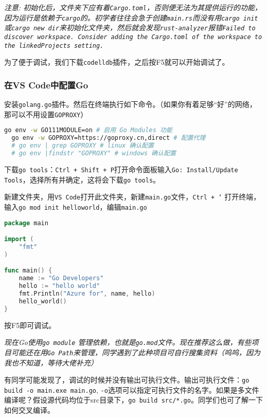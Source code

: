 \documentclass[../main.tex]{subfiles}
\begin{document}
\textit{注意: 初始化后，文件夹下应有着\texttt{Cargo.toml}，否则便无法为其提供运行的功能，因为运行是依赖于\texttt{cargo}的。初学者往往会急于创建\texttt{main.rs}而没有用\texttt{cargo init}或\texttt{cargo new dir}来初始化文件夹，然后就会发现\texttt{rust-analyzer}报错\texttt{Failed to discover workspace. Consider adding the Cargo.toml of the workspace to the linkedProjects setting.}}

为了便于调试，我们下载\texttt{codelldb}插件，之后按F5就可以开始调试了。

\subsubsection{在VS Code中配置Go}

安装\texttt{golang.go}插件。然后在终端执行如下命令。（如果你有着足够“好”的网络，那可以不用设置\texttt{GOPROXY}）

\begin{lstlisting}[language=bash]
  go env -w GO111MODULE=on # 启用 Go Modules 功能
  go env -w GOPROXY=https://goproxy.cn,direct # 配置代理
  # go env | grep GOPROXY # linux 确认配置
  # go env |findstr "GOPROXY" # windows 确认配置
\end{lstlisting}

下载\texttt{go tools}：\texttt{Ctrl + Shift + P}打开命令面板输入\texttt{Go: Install/Update Tools}，选择所有并确定，这将会下载\texttt{go tools}。

新建文件夹，用\texttt{VS Code}打开此文件夹，新建\texttt{main.go}文件，\texttt{Ctrl + `} 打开终端，输入\texttt{go mod init helloworld}，编辑\texttt{main.go}

\begin{lstlisting}[language=go]
package main

import (
	"fmt"
)

func main() {
	name := "Go Developers"
	hello := "hello world"
	fmt.Println("Azure for", name, hello)
	hello_world()
}
\end{lstlisting}

按F5即可调试。

\textit{现在Go使用\texttt{go module} 管理依赖，也就是\texttt{go.mod}文件。现在推荐这么做，有些项目可能还在用\texttt{Go Path}来管理，同学遇到了此种项目可自行搜集资料（呜呜，因为我也不知道，等待大佬补充）}

有同学可能发现了，调试的时候并没有输出可执行文件。输出可执行文件：\texttt{go build -o main.exe main.go}, \texttt{-o}选项可以指定可执行文件的名字。如果是多文件编译呢？假设源代码均位于src目录下，\texttt{go build src/*.go}。同学们也可了解一下如何交叉编译。
\end{document}
